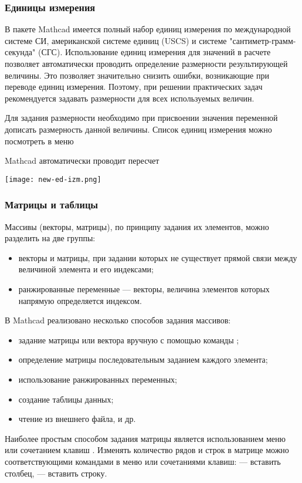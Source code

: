 \subsubsection*{Единицы измерения}
В пакете Mathcad имеется полный набор единиц измерения по международной системе СИ,  американской системе единиц  (USCS) и системе "сантиметр-грамм-секунда" (СГС). Использование единиц измерения для значений в расчете позволяет автоматически проводить определение размерности результирующей величины. Это позволяет значительно снизить ошибки, возникающие при переводе единиц измерения. Поэтому, при решении практических задач рекомендуется задавать размерности для всех используемых величин.

Для задания размерности необходимо при присвоении значения переменной дописать размерность данной величины. Список единиц измерения можно посмотреть в меню 

Mathcad автоматически проводит пересчет 
\begin{center}
	\texttt{[image: new-ed-izm.png]}
\end{center}

\subsubsection*{Матрицы и таблицы}
Массивы (векторы, матрицы), по принципу задания их элементов, можно разделить на две группы:
\begin{itemize}
\item векторы и матрицы, при задании которых не существует прямой связи между величиной элемента и его индексами;
\item ранжированные переменные --- векторы, величина элементов которых напрямую определяется индексом.
\end{itemize}
В Mathcad реализовано несколько способов задания массивов:
\begin{itemize}
	\item задание матрицы или вектора вручную с помощью команды ;
	\item определение матрицы последовательным заданием каждого элемента;
	\item использование ранжированных переменных;
	\item создание таблицы данных;
	\item чтение из внешнего файла, и др.
\end{itemize}

Наиболее простым способом задания матрицы является использованием меню  или сочетанием клавиш . Изменять количество рядов и строк в матрице можно соответствующими командами в меню или сочетаниями клавиш: \keys{\shift+\enter} --- вставить столбец,    --- вставить строку.

